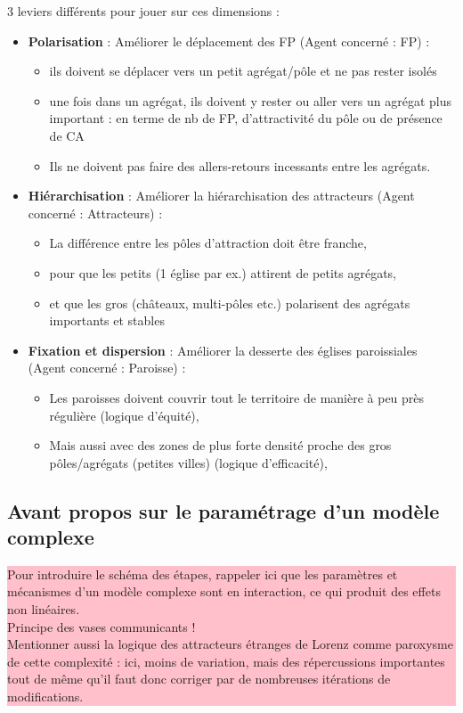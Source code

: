 \documentclass[12pt, a4paper, oneside]{book}
\begin{document}
	3 leviers différents pour jouer sur ces dimensions :
		\begin{itemize}
		\item \textbf{Polarisation} : Améliorer le déplacement des FP (Agent concerné : FP) :
			\begin{itemize}
				\item ils doivent se déplacer vers un petit agrégat/pôle et ne pas rester isolés
				\item une fois dans un agrégat, ils doivent y rester ou aller vers un agrégat plus \og important\fg{} : en terme de nb de FP, d'attractivité du pôle ou de présence de CA
				\item Ils ne doivent pas faire des allers-retours incessants entre les agrégats.
			\end{itemize}

		\item \textbf{Hiérarchisation} : Améliorer la hiérarchisation des attracteurs (Agent concerné : Attracteurs) :
			\begin{itemize}
				\item La différence entre les pôles d'attraction doit être franche,
				\item pour que les petits (1 église par ex.) attirent de petits agrégats,
				\item et que les gros (châteaux, multi-pôles etc.) polarisent des agrégats importants et stables
			\end{itemize}
		\item \textbf{Fixation et dispersion} : Améliorer la desserte des églises paroissiales (Agent concerné : Paroisse) :
			\begin{itemize}
				\item Les paroisses doivent couvrir tout le territoire de manière à peu près régulière (logique d'équité),
				\item Mais aussi avec des zones de plus forte densité proche des gros pôles/agrégats (petites villes) (logique d'efficacité),
			\end{itemize}
		
	\end{itemize}
	
	\subsection{Avant propos sur le paramétrage d'un modèle complexe}
		\colorbox{pink}{\parbox{0.9\textwidth}{%
			\vskip5pt
			Pour introduire le schéma des étapes, rappeler ici que les paramètres et mécanismes d'un modèle complexe sont en interaction, ce qui produit des effets non linéaires.\\
			Principe des vases communicants !\\
			Mentionner aussi la logique des attracteurs étranges de Lorenz comme paroxysme de cette complexité : ici, moins de variation, mais des répercussions importantes tout de même qu'il faut donc \og corriger\fg{} par de nombreuses itérations de modifications.
			\vskip5pt
		}
	}
\end{document}
